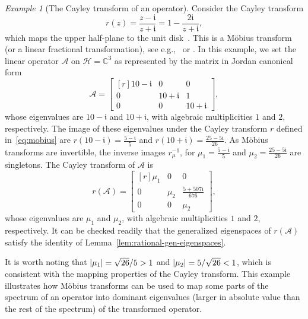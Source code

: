 \documentclass[12pt, oneside, reqno]{amsart}
\theoremstyle{remark}
\newtheorem{example}[theorem]{Example}
\newcommand{\ii}{\mathfrak{i}}
\newcommand{\CC}{\mathbb{C}}
\DeclarePairedDelimiter{\abs}{\lvert}{\rvert}
\newcommand{\Ac}{\mathcal{A}}
\newcommand{\Hc}{\mathcal{H}}
\begin{document}
\begin{example}[The Cayley transform of an operator]
  \label{ex:cayley}
  Consider the Cayley transform
  \begin{equation}
    \label{eq:mobius}
    r(z) = \frac{z - \ii}{z + \ii} = 1 - \frac{2\ii}{z + \ii},
  \end{equation}
  which maps the upper half-plane to the unit disk~\cite[Theorem
  6.3.6]{GreeKran06}.  This is a M\"obius transform (or a linear
  fractional transformation), see
  e.g.,~\cite[Section~III.3]{Conway2012} or
  \cite[Section~6.3]{GreeKran06}.  In this example, we set the linear
  operator \(\Ac\) on \(\Hc = \CC^3\) as represented by the matrix in
  Jordan canonical form
  \[
    \Ac =
    \begin{bmatrix*}[r]
      10 - \ii & 0 & 0 \\
      0 & 10 + \ii & 1 \\
      0 & 0 & 10 + \ii
    \end{bmatrix*},
  \]
  whose eigenvalues are \(10 - \ii\) and \(10 + \ii\), with algebraic
  multiplicities \(1\) and \(2\), respectively.
  The image of these eigenvalues under the Cayley transform
  \(r\) defined in~\eqref{eq:mobius} are
  \(r(10 - \ii) = \frac{5 - \ii}{5}\) and
  \(r(10 + \ii) = \frac{25 - 5\ii}{26}\).
  As M\"obius transforms are invertible, the inverse images
  \(r^{-1}_\mu\), for \(\mu_1 = \frac{5 - \ii}{5}\) and
  \(\mu_2 = \frac{25 - 5\ii}{26}\) are singletons.
  The  Cayley transform of \(\Ac\) is 
  \[
    r(\Ac) =
    \begin{bmatrix*}[r]
      \mu_1 & 0 & 0 \\
      0 & \mu_2 & \frac{5 + 507\ii}{676} \\
      0 & 0 & \mu_2
    \end{bmatrix*},
  \]
  whose eigenvalues are \(\mu_1\) and \(\mu_2\), with algebraic
  multiplicities \(1\) and \(2\), respectively.
  It can be checked readily that the generalized eigenspaces of
  \(r(\Ac)\) satisfy the identity of
  Lemma~\ref{lem:rational-gen-eigenspaces}.

  It is worth noting that \(\abs{\mu_1} = \sqrt{26}/5 > 1\) and
  \(\abs{\mu_2} = 5/\sqrt{26} < 1\), which is consistent with the
  mapping properties of the Cayley transform.  This example
  illustrates how M\"obius transforms can be used to map some parts of
  the spectrum of an operator into dominant eigenvalues (larger in
  absolute value than the rest of the spectrum) of the transformed operator.
\end{example}
  
\end{document}
